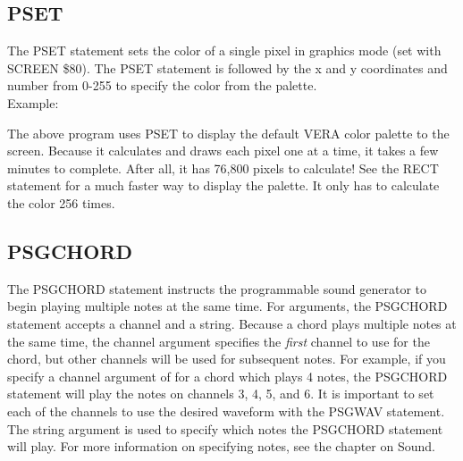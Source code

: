 \subsection{PSET}

The {\ttfamily PSET} statement sets the color of a single pixel in graphics
mode (set with {\ttfamily SCREEN \$80}).  The {\ttfamily PSET} statement is
followed by the x and y coordinates and number from 0-255 to specify the color
from the palette.\\

Example:\\


The above program uses {\ttfamily PSET} to display the default VERA color
palette to the screen.  Because it calculates and draws each pixel one at a
time, it takes a few minutes to complete.  After all, it has 76,800 pixels to
calculate!  See the {\ttfamily RECT} statement for a much faster way to display
the palette.  It only has to calculate the color 256 times.\\

\subsection{PSGCHORD}

The {\ttfamily PSGCHORD} statement instructs the programmable sound generator
to begin playing multiple notes at the same time.  For arguments, the
{\ttfamily PSGCHORD} statement accepts a channel and a string.  Because a chord
plays multiple notes at the same time, the channel argument specifies the
\emph{first} channel to use for the chord, but other channels will be used for
subsequent notes.  For example, if you specify a channel argument of {} for a chord which plays 4 notes, the {\ttfamily PSGCHORD} statement will
play the notes on channels 3, 4, 5, and 6.  It is important to set each of the
channels to use the desired waveform with the {\ttfamily PSGWAV} statement.
The string argument is used to specify which notes the {\ttfamily PSGCHORD}
statement will play.  For more information on specifying notes, see the chapter
on Sound.\\


